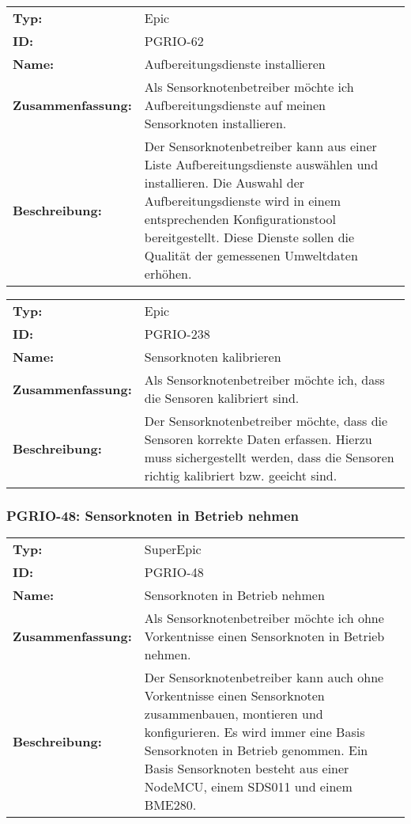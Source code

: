		\begin{flushleft} 
\begin{tabular}{@{}lp{100mm}} 
\textbf{Typ:} & Epic \\ 
\textbf{ID:} & PGRIO-62 \\ 
\textbf{Name:} & Aufbereitungsdienste installieren \\ 
\textbf{Zusammenfassung:} & Als Sensorknotenbetreiber möchte ich Aufbereitungsdienste auf meinen Sensorknoten installieren. \\ 
\textbf{Beschreibung:} & Der Sensorknotenbetreiber kann aus einer Liste Aufbereitungsdienste auswählen und installieren. Die Auswahl der Aufbereitungsdienste wird in einem entsprechenden Konfigurationstool bereitgestellt. Diese Dienste sollen die Qualität der gemessenen Umweltdaten erhöhen. \\ 
\end{tabular} 
\end{flushleft} 

		\begin{flushleft} 
\begin{tabular}{@{}lp{100mm}} 
\textbf{Typ:} & Epic \\ 
\textbf{ID:} & PGRIO-238 \\ 
\textbf{Name:} & Sensorknoten kalibrieren \\ 
\textbf{Zusammenfassung:} & Als Sensorknotenbetreiber möchte ich, dass die Sensoren kalibriert sind. \\ 
\textbf{Beschreibung:} & Der Sensorknotenbetreiber möchte, dass die Sensoren korrekte Daten erfassen. Hierzu muss sichergestellt werden, dass die Sensoren richtig kalibriert bzw. geeicht sind. \\ 
\end{tabular} 
\end{flushleft} 

	\subsubsection{PGRIO-48: Sensorknoten in Betrieb nehmen} 
\begin{flushleft} 
\begin{tabular}{@{}lp{100mm}} 
\textbf{Typ:} & SuperEpic \\ 
\textbf{ID:} & PGRIO-48 \\ 
\textbf{Name:} & Sensorknoten in Betrieb nehmen \\ 
\textbf{Zusammenfassung:} & Als Sensorknotenbetreiber möchte ich ohne Vorkentnisse einen Sensorknoten in Betrieb nehmen. \\ 
\textbf{Beschreibung:} & Der Sensorknotenbetreiber kann auch ohne Vorkentnisse einen Sensorknoten zusammenbauen, montieren und konfigurieren. Es wird immer eine Basis Sensorknoten in Betrieb genommen. Ein Basis Sensorknoten besteht aus einer NodeMCU, einem SDS011 und einem BME280. \\ 
\end{tabular} 
\end{flushleft} 

